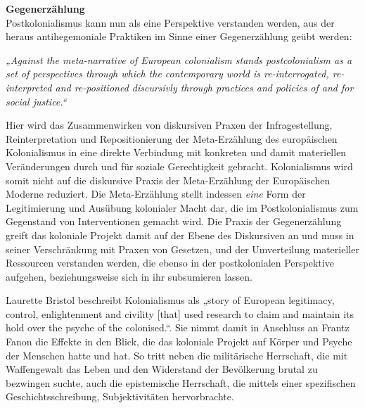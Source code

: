 \textbf{\large Gegenerzählung}\\

Postkolonialismus kann nun als eine Perspektive verstanden werden, aus der
heraus antihegemoniale Praktiken im Sinne einer Gegenerzählung geübt werden:
\begin{myenv}
  \textit{„Against the meta-narrative of European colonialism stands
  postcolonialism as a set of perspectives through which the contemporary world
is re-interrogated, re-interpreted and re-positioned discursivly through
practices and policies of and for social justice.“\footnotemark
{}}
\end{myenv}

Hier wird das Zusammenwirken von diskursiven Praxen der Infragestellung,
Reinterpretation und Repositionierung der Meta-Erzählung des europäischen
Kolonialismus in eine direkte Verbindung mit konkreten und damit materiellen
Veränderungen durch und für soziale Gerechtigkeit gebracht. Kolonialismus wird
somit nicht auf die diskursive Praxis der Meta-Erzählung der Europäischen
Moderne reduziert. Die Meta-Erzählung stellt indessen \textit{eine} Form der
Legitimierung und Ausübung kolonialer Macht dar, die im Postkolonialismus zum
Gegenstand von Interventionen gemacht wird.\footnotemark{} Die Praxis der Gegenerzählung greift das
koloniale Projekt damit auf der Ebene des Diskursiven an und muss in seiner
Verschränkung mit Praxen von Gesetzen, und der Umverteilung materieller
Ressourcen verstanden werden, die ebenso in der postkolonialen Perspektive
aufgehen, beziehungsweise sich in ihr subsumieren lassen.

Laurette Bristol beschreibt Kolonialismus als „story of European legitimacy,
control, enlightenment and civility [that] used research to claim and maintain
its hold over the psyche of the colonised.“\footnotemark {}. Sie nimmt damit in Anschluss an
Frantz Fanon die Effekte in den Blick, die das koloniale Projekt auf Körper und
Psyche der Menschen hatte und hat. So tritt neben die militärische Herrschaft,
die mit Waffengewalt das Leben und den Widerstand der Bevölkerung brutal zu
bezwingen suchte, auch die epistemische Herrschaft, die mittels einer
spezifischen Geschichtsschreibung, Subjektivitäten
hervorbrachte.\footnotemark{}

